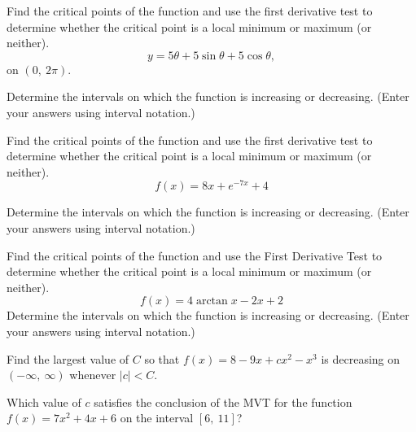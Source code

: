 \documentclass[12pt,addpoints, answers, fleqn]{exam}
\begin{document}
\begin{teacher}
\begin{questions}
Find the critical points of the function and use the first derivative test to determine whether the critical point is a local minimum or maximum (or neither).
\[
y = 5\theta + 5 \sin \theta + 5 \cos \theta,
\]
on $\left(0, \ 2 \pi \right)$.

Determine the intervals on which the function is increasing or decreasing. (Enter your answers using interval notation.)
\begin{solution}
\end{solution}
\question 	%

Find the critical points of the function and use the first derivative test to determine whether the critical point is a local minimum or maximum (or neither).
\[
f\left(x\right) = 8x + e^{-7x} + 4
\]

Determine the intervals on which the function is increasing or decreasing. (Enter your answers using interval notation.)
\begin{solution}
\end{solution}
\question 	%



Find the critical points of the function and use the First Derivative Test to determine whether the critical point is a local minimum or maximum (or neither).
\[
f \left( x \right) = 4 \arctan x - 2x + 2
\]
Determine the intervals on which the function is increasing or decreasing. (Enter your answers using interval notation.)
\begin{solution}
\end{solution}
\question 	%

Find the largest value of $C$ so that $f\left(x\right) = 8 - 9x + cx^2 - x^3$ is decreasing on $\left( - \infty, \ \infty \right)$ whenever $\left|c\right| < C$.
\begin{solution}
\end{solution}
\question 	%

Which value of $c$ satisfies the conclusion of the MVT for the function $f\left(x\right) = 7x^2 + 4x + 6$ on the interval $\left[6, \ 11\right]$?
\begin{solution}
\end{solution}

\end{questions}
\end{teacher}
\vfill
\pagebreak


\end{document}
